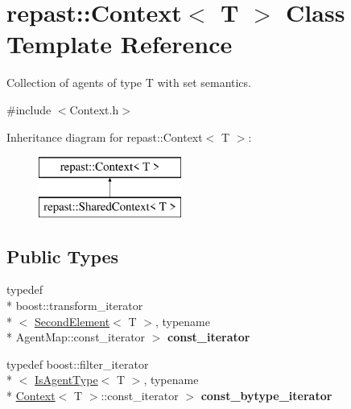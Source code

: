 \hypertarget{classrepast_1_1_context}{\section{repast\-:\-:Context$<$ T $>$ Class Template Reference}
\label{classrepast_1_1_context}
}


Collection of agents of type T with set semantics.  




{\ttfamily \#include $<$Context.\-h$>$}

Inheritance diagram for repast\-:\-:Context$<$ T $>$\-:\begin{figure}[H]
\begin{center}
\leavevmode
\includegraphics[height=2.000000cm]{classrepast_1_1_context}
\end{center}
\end{figure}
\subsection*{Public Types}
\begin{DoxyCompactItemize}
\item 
\hypertarget{classrepast_1_1_context_a94c26538a555d9d781034b89cfa1cc8a}{typedef \\*
boost\-::transform\-\_\-iterator\\*
$<$ \hyperlink{structrepast_1_1_second_element}{Second\-Element}$<$ T $>$, typename \\*
Agent\-Map\-::const\-\_\-iterator $>$ {\bfseries const\-\_\-iterator}}\label{classrepast_1_1_context_a94c26538a555d9d781034b89cfa1cc8a}

\item 
\hypertarget{classrepast_1_1_context_ac27ec9bbfb365044a5088e1cdedc3ad1}{typedef boost\-::filter\-\_\-iterator\\*
$<$ \hyperlink{structrepast_1_1_is_agent_type}{Is\-Agent\-Type}$<$ T $>$, typename \\*
\hyperlink{classrepast_1_1_context}{Context}$<$ T $>$\-::const\-\_\-iterator $>$ {\bfseries const\-\_\-bytype\-\_\-iterator}}\label{classrepast_1_1_context_ac27ec9bbfb365044a5088e1cdedc3ad1}

\end{DoxyCompactItemize}
